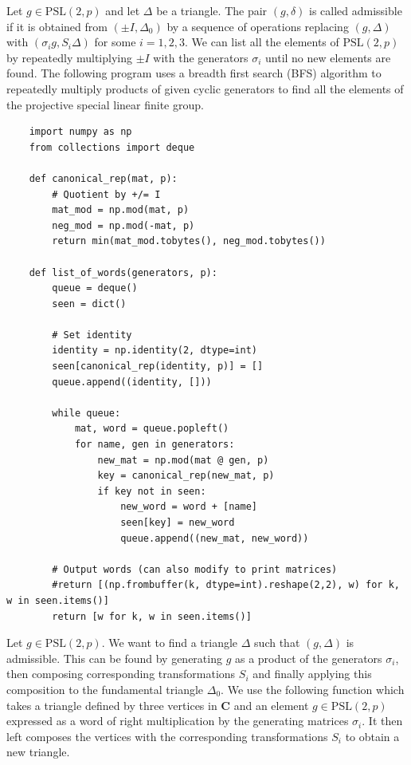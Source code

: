 \documentclass{article}
\begin{document}
Let \(g \in \mathrm{PSL}(2, p)\) and let \(\Delta\) be a triangle. The pair \((g, \delta)\) is called admissible if it is obtained from \((\pm I, \Delta_0)\) by a sequence of operations replacing \((g, \Delta)\) with \((\sigma_i g, S_i\Delta)\) for some \(i = 1,2,3\). We can list all the elements of \(\mathrm{PSL}(2, p)\) by repeatedly multiplying \(\pm I\) with the generators \(\sigma_i\) until no new elements are found. The following program uses a breadth first search (BFS) algorithm to repeatedly multiply products of given cyclic generators to find all the elements of the projective special linear finite group.

\begin{verbatim}
    import numpy as np
    from collections import deque
    
    def canonical_rep(mat, p):
        # Quotient by +/= I
        mat_mod = np.mod(mat, p)
        neg_mod = np.mod(-mat, p)
        return min(mat_mod.tobytes(), neg_mod.tobytes())
    
    def list_of_words(generators, p):
        queue = deque()
        seen = dict()
        
        # Set identity
        identity = np.identity(2, dtype=int)
        seen[canonical_rep(identity, p)] = []
        queue.append((identity, []))
    
        while queue:
            mat, word = queue.popleft()
            for name, gen in generators:
                new_mat = np.mod(mat @ gen, p)
                key = canonical_rep(new_mat, p)
                if key not in seen:
                    new_word = word + [name]
                    seen[key] = new_word
                    queue.append((new_mat, new_word))
    
        # Output words (can also modify to print matrices)
        #return [(np.frombuffer(k, dtype=int).reshape(2,2), w) for k, w in seen.items()]
        return [w for k, w in seen.items()]
\end{verbatim}

Let \(g \in \mathrm{PSL}(2,p)\). We want to find a triangle \(\Delta\) such that \((g,\Delta)\) is admissible. This can be found by generating \(g\) as a product of the generators \(\sigma_i\), then composing corresponding transformations \(S_i\) and finally applying this composition to the fundamental triangle \(\Delta_0\). We use the following function which takes a triangle defined by three vertices in \(\mathbf{C}\) and an element \(g \in \mathrm{PSL}(2, p)\) expressed as a word of right multiplication by the generating matrices \(\sigma_i\). It then left composes the vertices with the corresponding transformations \(S_i\) to obtain a new triangle.
\end{document}
